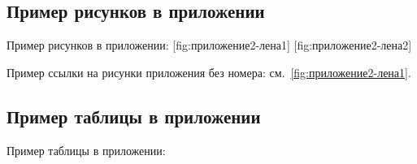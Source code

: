 \newpage
\subsection{Пример рисунков в приложении}

Пример рисунков в приложении:
[fig:приложение2-лена1]
[fig:приложение2-лена2]

Пример ссылки на рисунки приложения без номера: см.~\ref{fig:приложение2-лена1}.

\subsection{Пример таблицы в приложении}

Пример таблицы в приложении:

